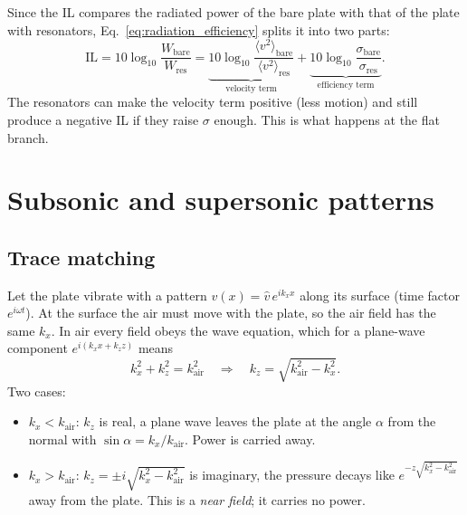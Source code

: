 Since the IL compares the radiated power of the bare plate with that of the plate
with resonators, Eq.~\eqref{eq:radiation_efficiency} splits it into two parts:
\begin{equation}
  \mathrm{IL} = 10\log_{10}\frac{W_\mathrm{bare}}{W_\mathrm{res}}
  = \underbrace{10\log_{10}\frac{\langle v^2\rangle_\mathrm{bare}}{\langle v^2\rangle_\mathrm{res}}}_{\text{velocity term}}
  + \underbrace{10\log_{10}\frac{\sigma_\mathrm{bare}}{\sigma_\mathrm{res}}}_{\text{efficiency term}} .
  \label{eq:il_split}
\end{equation}
The resonators can make the velocity term positive (less motion) and still produce
a negative IL if they raise $\sigma$ enough. This is what happens at the flat branch.

\section{Subsonic and supersonic patterns}

\subsection{Trace matching}
Let the plate vibrate with a pattern $v(x) = \hat v\, e^{i k_x x}$ along its surface
(time factor $e^{i\omega t}$). At the surface the air must move with the plate, so
the air field has the same $k_x$. In air every field obeys the wave equation,
which for a plane-wave component $e^{i(k_x x + k_z z)}$ means
\begin{equation}
  k_x^2 + k_z^2 = k_\mathrm{air}^2
  \quad\Longrightarrow\quad
  k_z = \sqrt{k_\mathrm{air}^2 - k_x^2} .
\end{equation}
Two cases:
\begin{itemize}
  \item $k_x < k_\mathrm{air}$: $k_z$ is real, a plane wave leaves the plate at the
        angle $\alpha$ from the normal with $\sin\alpha = k_x/k_\mathrm{air}$. Power
        is carried away.
  \item $k_x > k_\mathrm{air}$: $k_z = \pm i\sqrt{k_x^2 - k_\mathrm{air}^2}$ is
        imaginary, the pressure decays like
        $e^{-z\sqrt{k_x^2 - k_\mathrm{air}^2}}$ away from the plate. This is a
        \emph{near field}; it carries no power.
\end{itemize}

